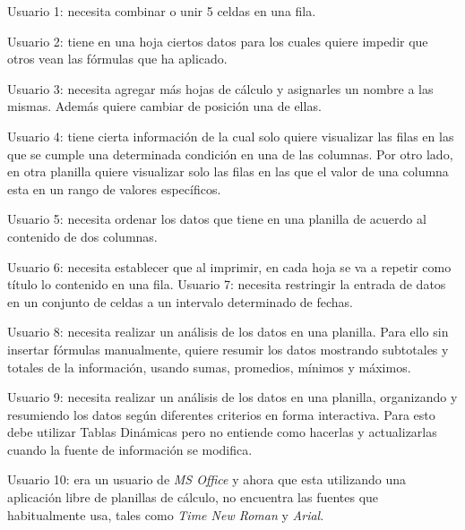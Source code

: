 \documentclass[12pt]{article}
\begin{document}
\begin{description}

    \item{Usuario 1}: necesita combinar o unir 5 celdas en una fila.

    \item{Usuario 2}: tiene en una hoja ciertos datos para los cuales quiere
    impedir que otros vean las fórmulas que ha aplicado.

    \item{Usuario 3}: necesita agregar más hojas de cálculo y asignarles un
    nombre a las mismas. Además quiere cambiar de posición una de ellas.

    \item{Usuario 4}: tiene cierta información de la cual solo quiere
    visualizar las filas en las que se cumple una determinada condición en una
    de las columnas. Por otro lado, en otra planilla quiere visualizar solo
    las filas en las que el valor de una columna esta en un rango de valores
    específicos.

    \item{Usuario 5}: necesita ordenar los datos que tiene en una planilla de
    acuerdo al contenido de dos columnas.

    \item{Usuario 6}: necesita establecer que al imprimir, en cada hoja se va
    a repetir como título lo contenido en una fila.  Usuario 7: necesita
    restringir la entrada de datos en un conjunto de celdas a un intervalo
    determinado de fechas.

    \item{Usuario 8}: necesita realizar un análisis de los datos en una
    planilla. Para ello sin insertar fórmulas manualmente, quiere resumir los
    datos mostrando subtotales y totales de la información, usando sumas,
    promedios, mínimos y máximos.

    \item{Usuario 9}: necesita realizar un análisis de los datos en una
    planilla, organizando y resumiendo los datos según diferentes criterios en
    forma interactiva. Para esto debe utilizar Tablas Dinámicas pero no
    entiende como hacerlas y actualizarlas cuando la fuente de información se
    modifica.

    \item{Usuario 10}: era un usuario de \emph{MS Office} y ahora que esta utilizando
    una aplicación libre de planillas de cálculo, no encuentra las fuentes que
    habitualmente usa, tales como \emph{Time New Roman} y \emph{Arial}.

\end{description}
\end{document}
